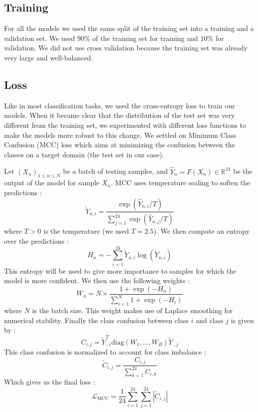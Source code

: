 \documentclass[switch, 11pt]{article}
\newcommand{\R}{\mathbb{R}}
\begin{document}
\begin{multicols}{2}
    \section{Training}

    For all the models we used the same split of the training set into a training and a validation set. We used $90\%$ of the training set for training and $10\%$ for validation. We did not use cross validation because the training set was already very large and well-balanced.

    \subsection{Loss}
    Like in most classification tasks, we used the cross-entropy loss to train our models. When it became clear that the distribution of the test set was very different from the training set, we experimented with different loss functions to make the models more robust to this change. We settled on Minimum Class Confusion (MCC) loss \cite{jin-2020} which aims at minimizing the confusion between the classes on a target domain (the test set in our case).

    Let $(X_n)_{1\leq n\leq N}$ be a batch of testing samples, and $\hat{Y}_n = F(X_n)\in\R^{24}$ be the output of the model for sample $X_n$. MCC uses temperature scaling to soften the predictions :
    \begin{equation}
        \tilde{Y}_{n,i} = \frac{\exp\left(\hat{Y}_{n,i}/T\right)}{\sum_{j=1}^{24}\exp\left(\hat{Y}_{n,j}/T\right)}
    \end{equation}
    where $T>0$ is the temperature (we used $T=2.5$). We then compute an entropy over the predictions :
    \begin{equation}
        H_n = -\sum_{i=1}^{24}\tilde{Y}_{n,i}\log\left(\tilde{Y}_{n,i}\right)
    \end{equation}
    This entropy will be used to give more importance to samples for which the model is more confident. We then use the following weights :
    \begin{equation}
        W_n = N\times\frac{1+\exp(-H_n)}{\sum_{i=1}^{N} 1+\exp(-H_i)}
    \end{equation}
    where $N$ is the batch size. This weight makes use of Laplace smoothing for numerical stability. Finally the class confusion between class $i$ and class $j$ is given by :
    \begin{equation}
        C_{i,j} = \tilde{Y}_{\cdot,i}^T \text{diag}(W_1,\dots,W_B) \tilde{Y}_{\cdot,j}
    \end{equation}
    This class confusion is normalized to account for class imbalance :
    \begin{equation}
        \tilde{C}_{i,j} = \frac{C_{i,j}}{\sum_{k=1}^{24}C_{i,k}}
    \end{equation}
    Which gives us the final loss :
    \begin{equation}
        \mathcal{L}_{\text{MCC}} = \frac{1}{24}\sum_{i=1}^{24}\sum_{j=1}^{24}\left|\tilde{C}_{i,j}\right|
    \end{equation}


\end{multicols}
\end{document}

